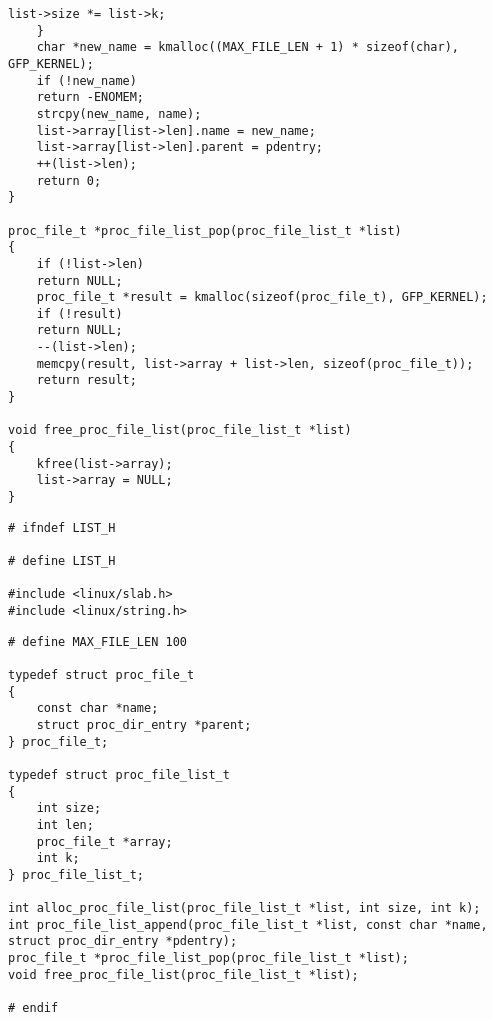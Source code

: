 \begin{center}
\begin{lstlisting}[label=listing_list_c2,caption=Файл list.c]
		list->size *= list->k;
	}
	char *new_name = kmalloc((MAX_FILE_LEN + 1) * sizeof(char), GFP_KERNEL);
	if (!new_name)
	return -ENOMEM;
	strcpy(new_name, name);
	list->array[list->len].name = new_name;
	list->array[list->len].parent = pdentry;
	++(list->len);
	return 0;
}

proc_file_t *proc_file_list_pop(proc_file_list_t *list)
{
	if (!list->len)
	return NULL;
	proc_file_t *result = kmalloc(sizeof(proc_file_t), GFP_KERNEL);
	if (!result)
	return NULL;
	--(list->len);
	memcpy(result, list->array + list->len, sizeof(proc_file_t));
	return result;
}

void free_proc_file_list(proc_file_list_t *list)
{
	kfree(list->array);
	list->array = NULL;
}
	\end{lstlisting}
\end{center}

\begin{center}
	\begin{lstlisting}[label=listing_list_h1,caption=Файл list.h]
# ifndef LIST_H

# define LIST_H

#include <linux/slab.h>
#include <linux/string.h>
	\end{lstlisting}
\end{center}

\begin{center}
\begin{lstlisting}[label=listing_list_h2,caption=Файл list.h]
# define MAX_FILE_LEN 100

typedef struct proc_file_t
{
	const char *name;
	struct proc_dir_entry *parent;
} proc_file_t;

typedef struct proc_file_list_t
{
	int size;
	int len;
	proc_file_t *array;
	int k;
} proc_file_list_t;

int alloc_proc_file_list(proc_file_list_t *list, int size, int k);
int proc_file_list_append(proc_file_list_t *list, const char *name, struct proc_dir_entry *pdentry);
proc_file_t *proc_file_list_pop(proc_file_list_t *list);
void free_proc_file_list(proc_file_list_t *list);

# endif
\end{lstlisting}
\end{center}

